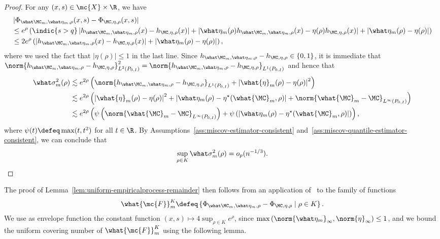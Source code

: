 \begin{proof}
For any $(x, s) \in \mc{X} \times \R$, we have
\begin{align*}
&\left| \Phi_{\what \MC_m, \what \eta_m, \rho}(x,s) - \Phi_{\MC,  \eta, \rho}(x,s)  \right| \\
&\le e^\rho \left( \indic{ s > q} \left| h_{\what \MC_m, \what \eta_m, \rho}(x) - h_{\MC, \eta, \rho}(x) \right| + \left|\what \eta_m(\rho)h_{\what \MC_m, \what \eta_m, \rho}(x) - \eta(\rho) h_{\MC, \eta, \rho}(x)\right| + \left| \what \eta_m(\rho) - \eta(\rho)\right| \right) \\
&\le 2e^\rho \left( \left| h_{\what \MC_m, \what \eta_m, \rho}(x) - h_{\MC, \eta, \rho}(x) \right| + \left| \what \eta_m(\rho) - \eta(\rho) \right|  \right),
\end{align*}
where we used the fact that $\left| \eta(\rho) \right| \le 1$ in the last line.
Since $h_{\what \MC_m, \what \eta_m, \rho} - h_{\MC, \eta, \rho} \in \{0,1\}$, it is immediate that $\norm{ h_{\what \MC_m, \what \eta_m, \rho} - h_{\MC, \eta, \rho}}_{L^2(P_{0,I})}^2= \norm{ h_{\what \MC_m, \what \eta_m, \rho} - h_{\MC, \eta, \rho}}_{L^1(P_{0,I})}$ and hence that
\begin{align*}
\what \sigma_m^2(\rho) &\lesssim e^{2\rho} \left( \norm{ h_{\what \MC_m, \what \eta_m, \rho} - h_{\MC, \eta, \rho}}_{L^1(P_{0,I})} + \left| \what{\eta}_m(\rho) - \eta(\rho) \right|^2 
\right) \\
&\lesssim e^{2\rho} \left( \left| \what{\eta}_m(\rho) - \eta(\rho) \right|^2  + \left| \what \eta_m(\rho) - \eta^\star(\what{\MC}_m, \rho) \right| + \norm{\what{\MC}_m - \MC}_{L^\infty(P_{0,I})} \right) \\
&\lesssim e^{2\rho} \left( \psi\left( \norm{\what{\MC}_m - \MC}_{L^\infty(P_{0,I})} \right) +  \psi\left( \left|\what \eta_m(\rho) - \eta^\star(\what{\MC}_m, \rho) \right| \right) \right),
\end{align*}
where $\psi(t) \defeq \max(t,t^2)$ for all $t \in \R$.
By Assumptions~\ref{ass:miscov-estimator-consistent} and~\ref{ass:miscov-quantile-estimator-consistent}, we can conclude that
\begin{align*}
\sup_{\rho \in K} \what \sigma_m^2(\rho) = o_p(n^{-1/3}).
\end{align*}
\end{proof}
The proof of Lemma~\ref{lem:uniform-empiricalprocess-remainder} then follows from an application of~\citet[Lemma 6.2]{ChernozhukovChDeDuHaNeRo16} to the family of functions
\begin{align*}
\what{\mc{F}}_m^K \defeq \left\{ \Phi_{\what \MC_m, \what \eta_m, \rho} - \Phi_{\MC,  \eta, \rho} \mid \rho \in K \right\}.
\end{align*}
We use as envelope function the constant function $(x,s) \mapsto 4\sup_{\rho\in K} e^\rho$, since $\max\left(\norm{\what \eta_m}_\infty, \norm{\eta}_\infty \right) \le 1$, and we bound the uniform covering number of $\what{\mc{F}}_m^K$ using the following lemma.

